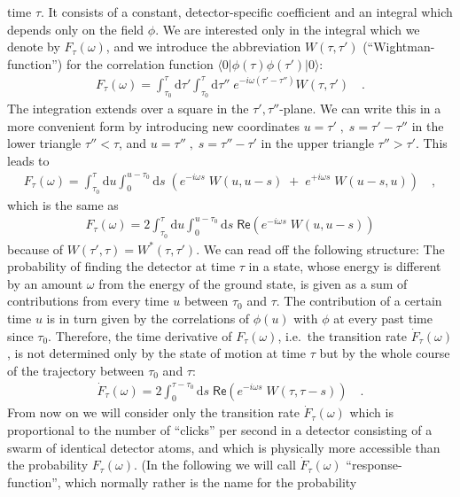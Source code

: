 \documentclass[a4paper,12pt]{article}
\renewcommand{\Re}{\mathsf{Re}}
\newcommand{\bra}[1]{\langle #1|}
\newcommand{\ket}[1]{|#1\rangle }
\newcommand{\Fd}{\dot F_{\tau}(\omega)}
\newcommand{\vac}{\ket{0}}
\newcommand{\cav}{\bra{0}}
\renewcommand{\d}{\mathrm{d}}
\begin{document}
time $\tau$. It consists of a constant, detector-specific coefficient and an integral
which depends only on the field $\phi$. We are interested only in the integral
which we denote by $F_\tau(\omega)$, and we introduce the abbreviation 
$W(\tau,\tau')$ (``Wightman-function'') for the correlation function 
$\cav\phi(\tau)\phi( \tau')\vac$:
\begin{eqnarray*}
F_\tau(\omega)=\int_{\tau_0}^\tau\d\tau'\int_{\tau_0}^\tau\d\tau''\;
e^{-i\omega(\tau'-\tau'')}W(\tau,\tau')\quad.
\end{eqnarray*}
The integration extends over a square in the $\tau',\tau''$-plane. 
We can write this in a more convenient form by introducing new
coordinates $u=\tau'\;,\; s=\tau'-\tau''$ in the lower triangle $\tau''<\tau$,
and $u=\tau''\;,\; s=\tau''-\tau'$ in the upper triangle $\tau''>\tau'$.
This leads to
\begin{eqnarray*}
F_{\tau}(\omega)= \int_{\tau_0}^{\tau}\d u\int_0^{u-\tau_0}\d s\; \left( 
e^{-i\omega s}\; W(u,u-s)\;+\;e^{+i\omega s}\; W(u-s,u)\right)\quad,
\end{eqnarray*}
which is the same as
\begin{eqnarray*}
F_{\tau}(\omega)=2\int_{\tau_0}^{\tau}\d u\int_0^{u-\tau_0}\d s\;\Re\left(
e^{-i\omega s}\;W(u,u-s)\right)
\end{eqnarray*}
because of $W(\tau',\tau)=W^*(\tau,\tau')$.
We can read off the following structure: The probability of finding the detector at 
time $\tau$ in a state, whose energy is different by an amount $\omega$ from the 
energy of the ground state, is given as a sum of contributions from every time $u$
between $\tau_0$ and $\tau$. The contribution of a certain time $u$ is in turn given
by the correlations of $\phi(u)$ with $\phi$ at every past time since $\tau_0$.
Therefore, the time derivative of $F_{\tau}(\omega)$, i.e.\ the transition rate $\Fd$,
is not determined only by the state of motion at time $\tau$ but by the whole course of
the trajectory between $\tau_0$ and $\tau$:
\begin{eqnarray*}
\Fd=2\int_0^{\tau-\tau_0}\d s\;\Re\left(e^{-i\omega s}\;W(\tau,\tau-s)\right)\quad.
\end{eqnarray*}
From now on we will consider only the transition rate $\Fd$ which is proportional to
the number of ``clicks'' per second in a detector consisting of a swarm of identical
detector atoms, and which is physically
more accessible than the probability $F_{\tau}(\omega)$. (In the following we will
call $\Fd$ ``response-function'', which normally rather is the name for the probability
\end{document}
